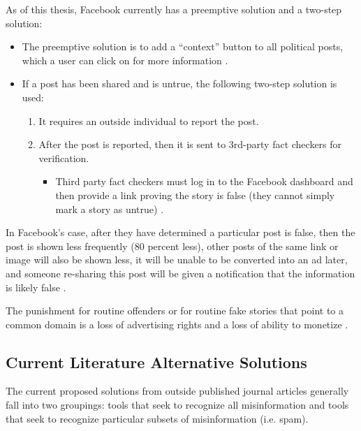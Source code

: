 \documentclass[preprint,review,12pt]{elsarticle}
\begin{document}
As of this thesis, Facebook currently has a preemptive solution and a two-step solution:
\renewcommand{\labelenumii}{\Roman{enumii}}
\begin{itemize}
\item The preemptive solution is to add a “context” button to all political posts, which a user can click on for more information \cite{smith2018designing}.
 \item If a post has been shared and is untrue, the following two-step solution is used:
 \begin{enumerate}
     \item It requires an outside individual to report the post. 
     \item After the post is reported, then it is  sent to 3rd-party fact checkers for verification. 
     \begin{itemize}
     \item Third party fact checkers must log in to the Facebook dashboard and then provide a link proving the story is false (they cannot simply mark a story as untrue) \cite{owen2016clamping}.
     \end{itemize}
 \end{enumerate}
 \end{itemize}
 
 In Facebook’s case, after they have determined a particular post is false, then the post is shown less frequently (80 percent less), other posts of the same link or image will also be shown less, it will be unable to be converted into an ad later, and someone re-sharing this post will be given a notification that the information is likely false \cite{owen2016clamping,facebook2020fact}.
 
 The punishment for routine offenders or for routine fake stories that point to a common domain is a loss of advertising rights and a loss of ability to monetize \cite{facebook2020fact}.
 
 \subsection{Current Literature Alternative Solutions}
 \label{sec: literature review}
 The current proposed solutions from outside published journal articles generally fall into two groupings: tools that seek to recognize all misinformation and tools that seek to recognize particular subsets of misinformation (i.e. spam).
\end{document}
